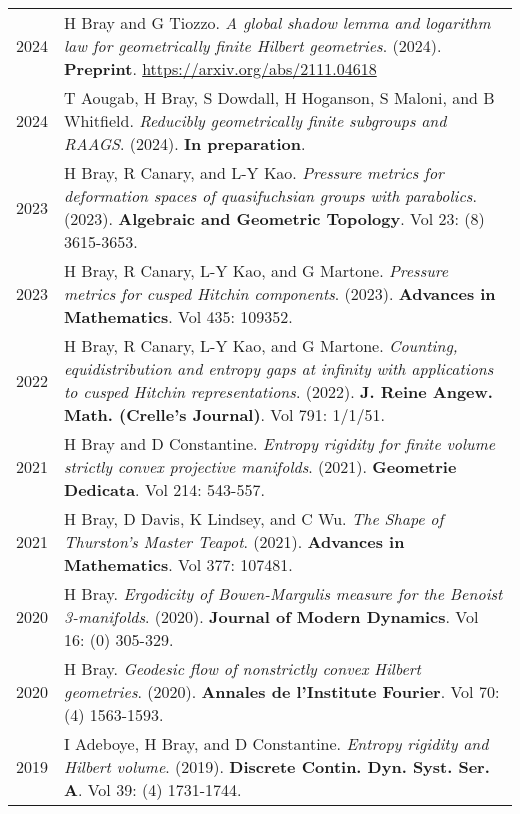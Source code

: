 
    \medskip


    \medskip
    
    \begin{center}
    {
    \renewcommand{\arraystretch}{1.5}
    \begin{longtable}{p{}  p{}}
    
2024 & 
        H Bray and G Tiozzo. \textit{A global shadow lemma and logarithm law for geometrically finite Hilbert geometries}. (2024). 
         \textbf{Preprint}. \url{https://arxiv.org/abs/2111.04618}\\ 

2024 & 
        T Aougab, H Bray, S Dowdall, H Hoganson, S Maloni, and B Whitfield. \textit{Reducibly geometrically finite subgroups and RAAGS}. (2024). 
         \textbf{In preparation}. \\ 

2023 & 
        H Bray, R Canary, and L-Y Kao. \textit{Pressure metrics for deformation spaces of quasifuchsian groups with parabolics}. (2023). 
        \textbf{Algebraic and Geometric Topology}. Vol 23: (8) 3615-3653.\\ 

2023 & 
        H Bray, R Canary, L-Y Kao, and G Martone. \textit{Pressure metrics for cusped Hitchin components}. (2023). 
        \textbf{Advances in Mathematics}. Vol 435: 109352.\\ 

2022 & 
        H Bray, R Canary, L-Y Kao, and G Martone. \textit{Counting, equidistribution and entropy gaps at infinity with applications to cusped Hitchin representations}. (2022). 
        \textbf{J. Reine Angew. Math. (Crelle's Journal)}. Vol 791: 1/1/51.\\ 

2021 & 
        H Bray and D Constantine. \textit{Entropy rigidity for finite volume strictly convex projective manifolds}. (2021). 
        \textbf{Geometrie Dedicata}. Vol 214: 543-557.\\ 

2021 & 
        H Bray, D Davis, K Lindsey, and C Wu. \textit{The Shape of Thurston's Master Teapot}. (2021). 
        \textbf{Advances in Mathematics}. Vol 377: 107481.\\ 

2020 & 
        H Bray. \textit{Ergodicity of Bowen-Margulis measure for the Benoist 3-manifolds}. (2020). 
        \textbf{Journal of Modern Dynamics}. Vol 16: (0) 305-329.\\ 

2020 & 
        H Bray. \textit{Geodesic flow of nonstrictly convex Hilbert geometries}. (2020). 
        \textbf{Annales de l'Institute Fourier}. Vol 70: (4) 1563-1593.\\ 

2019 & 
        I Adeboye, H Bray, and D Constantine. \textit{Entropy rigidity and Hilbert volume}. (2019). 
        \textbf{Discrete Contin. Dyn. Syst. Ser. A}. Vol 39: (4) 1731-1744.
    \end{longtable}
    } 
    \end{center}

    \vspace{-1em}
    